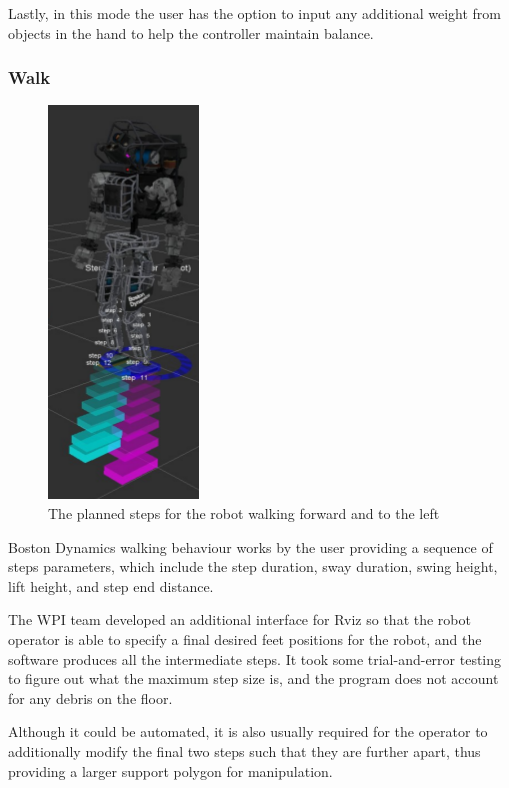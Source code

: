 \documentclass[12pt]{report}
\begin{document}
Lastly, in this mode the user has the option to input any additional weight from objects in the hand to help the controller maintain balance.


\subsubsection{Walk}
 \begin{figure}
  \begin{center}
    \includegraphics[scale=0.4]{images/step_gui.png}
  \end{center}
  \caption{The planned steps for the robot walking forward and to the left}
\end{figure}


Boston Dynamics walking behaviour works by the user providing a sequence of steps parameters, which include the step duration, sway duration, swing height, lift height, and step end distance.   

The WPI team developed an additional interface for Rviz so that the robot operator is able to specify a final desired feet positions for the robot, and the software produces all the intermediate steps. It took some trial-and-error testing to figure out what the maximum step size is, and the program does not account for any debris on the floor.

Although it could be automated, it is also usually required for the operator to additionally modify the final two steps such that they are further apart, thus providing a larger support polygon for manipulation. 
\end{document}
